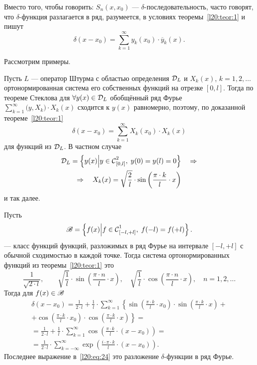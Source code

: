 Вместо того, чтобы говорить: $S_n(x,x_0)$ --- $\delta$-последовательность, часто говорят, что $\delta$-функция разлагается в ряд, разумеется, в условиях теоремы~\ref{l20:teor:1} и пишут 
\begin{equation}\label{l20:eq:22}
	\delta(x-x_0)=\sum\limits_{k=1}^{\infty}y_k(x_0)\cdot\overline{y}_k(x).
\end{equation}

\noindent Рассмотрим примеры.
\begin{enumerateD}
	\item Пусть $L$ --- оператор Штурма с областью определения $\mc{D}_L$ и $X_k(x)$, $k=1,2,\ldots$ ортонормированная система его собственных функций на отрезке $[0,l]$. Тогда по теореме Стеклова для $\forall y(x)\in\mc{D}_L$ обобщённый ряд Фурье $\displaystyle\sum\limits_{k=1}^{\infty}\big(y,X_k\big)\cdot X_k(x)$ сходится к $y(x)$ равномерно, поэтому, по доказанной теореме~\ref{l20:teor:1}
	\begin{equation}\label{l20:eq:23}
		\delta(x-x_0)=\sum\limits_{k=1}^{\infty}X_k(x_0)\cdot X_k(x)
	\end{equation}
	для функций из $\mc{D}_L$. В частном случае
	\begin{multline*}
		\mc{D}_L=\left\{y(x)\middle|y\in\Cfn[{[0,l]}]{2},\;y(0)=y(l)=0\right\}\quad\Rightarrow\\\Rightarrow\quad X_k(x)=\sqrt{\frac{2}{l}}\cdot\sin\left(\frac{\pi\cdot k}{
			l}\cdot x\right)
	\end{multline*}
	и так далее.
	\item Пусть
	\begin{equation*}
		\ms{B}=\left\{f(x)\middle|f\in\Cfn[{[-l,+l]}]{1},\;f(-l)=f(+l)\right\}.
	\end{equation*}
	 --- класс функций функций, разложимых в ряд Фурье на интервале $[-l,+l]$ с обычной сходимостью в каждой точке. Тогда система ортонормированных функций из теоремы~\ref{l20:teor:1} это 
	\begin{equation*}
		\frac{1}{\sqrt{2\cdot l}},\qquad\sqrt{\frac{1}{l}}\cdot\sin\left(\frac{\pi\cdot n}{l}\cdot x\right),\quad\sqrt{\frac{1}{l}}\cdot\cos\left(\frac{\pi\cdot n}{l}\cdot x\right),\quad n=1,2,\ldots
	\end{equation*}
	Тогда для $f(x)\in\ms{B}$
	\begin{multline}\label{l20:eq:24}
		\delta(x-x_0)=\frac{1}{2\cdot l}+\frac{1}{l}\cdot\sum\limits_{k=1}^{\infty}\left\{\sin\left(\frac{\pi\cdot k}{l}\cdot x_0\right)\cdot\sin\left(\frac{\pi\cdot k}{l}\cdot x\right)+\right.\\\left.+\cos\left(\frac{\pi\cdot k}{l}\cdot x_0\right)\cdot\cos\left(\frac{\pi\cdot k}{l}\cdot x\right)\right\}=\\
		=\frac{1}{2\cdot l}+\frac{1}{l}\cdot\sum\limits_{k=1}^{\infty}\cos\left(\frac{\pi\cdot k}{l}\cdot (x-x_0)\right)=\\=\frac{1}{2\cdot l}\cdot\sum\limits_{k=-\infty}^{\infty}\exp\left(\frac{i\cdot\pi\cdot k}{l}\cdot (x-x_0)\right).
	\end{multline}
	Последнее выражение в~\eqref{l20:eq:24} это разложение $\delta$-функции в ряд Фурье.
\end{enumerateD}

